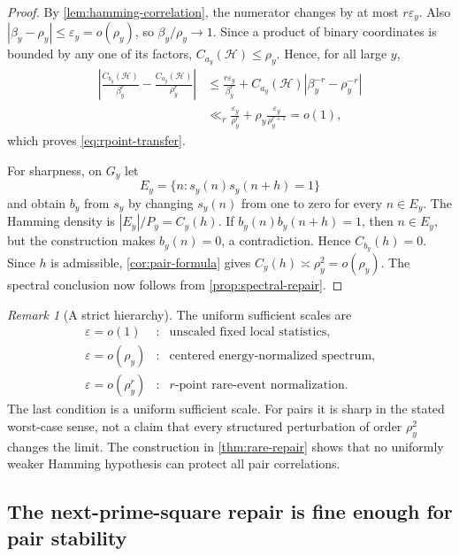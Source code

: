 \documentclass[11pt]{article}
\theoremstyle{definition}
\theoremstyle{remark}
\newtheorem{remark}[theorem]{Remark}
\newcommand{\cH}{\mathcal H}
\newcommand{\eps}{\varepsilon}
\begin{document}
\begin{proof}
By \cref{lem:hamming-correlation}, the numerator changes by at most $r\eps_y$.  Also $|\beta_y-\rho_y|\le\eps_y=o(\rho_y)$, so $\beta_y/\rho_y\to1$.  Since a product of binary coordinates is bounded by any one of its factors, $C_{a_y}(\cH)\le\rho_y$.  Hence, for all large $y$,
\[
 \begin{split}
 \left|\frac{C_{b_y}(\cH)}{\beta_y^r}
       -\frac{C_{a_y}(\cH)}{\rho_y^r}\right|
 &\le \frac{r\eps_y}{\beta_y^r}
   +C_{a_y}(\cH)\left|\beta_y^{-r}-\rho_y^{-r}\right|\\
 &\ll_r \frac{\eps_y}{\rho_y^r}
   +\rho_y\frac{\eps_y}{\rho_y^{r+1}}
 =o(1),
 \end{split}
\]
which proves \eqref{eq:rpoint-transfer}.

For sharpness, on $G_y$ let
\[
    E_y=\{n:s_y(n)s_y(n+h)=1\}
\]
and obtain $b_y$ from $s_y$ by changing $s_y(n)$ from one to zero for every $n\in E_y$.  The Hamming density is $|E_y|/P_y=C_y(h)$.  If $b_y(n)b_y(n+h)=1$, then $n\in E_y$, but the construction makes $b_y(n)=0$, a contradiction.  Hence $C_{b_y}(h)=0$.  Since $h$ is admissible, \cref{cor:pair-formula} gives $C_y(h)\asymp\rho_y^2=o(\rho_y)$.  The spectral conclusion now follows from \cref{prop:spectral-repair}.
\end{proof}

\begin{remark}[A strict hierarchy]\label{rem:repair-hierarchy}
The uniform sufficient scales are
\[
 \begin{array}{ccl}
 \eps=o(1)&:&\text{unscaled fixed local statistics},\\
 \eps=o(\rho_y)&:&\text{centered energy-normalized spectrum},\\
 \eps=o(\rho_y^r)&:&\text{$r$-point rare-event normalization}.
 \end{array}
\]
The last condition is a uniform sufficient scale.  For pairs it is sharp in the stated worst-case sense, not a claim that every structured perturbation of order $\rho_y^2$ changes the limit.  The construction in \cref{thm:rare-repair} shows that no uniformly weaker Hamming hypothesis can protect all pair correlations.
\end{remark}

\subsection{The next-prime-square repair is fine enough for pair stability}
\end{document}

